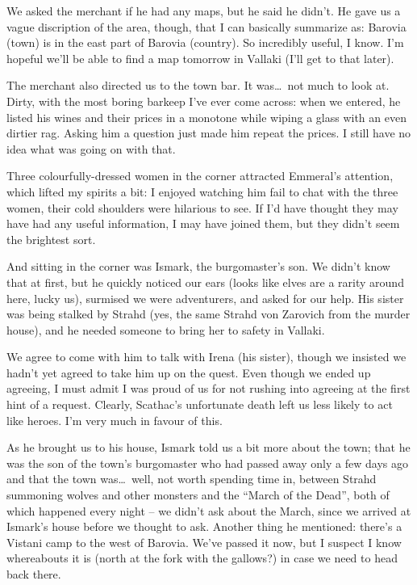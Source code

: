 We asked the merchant if he had any maps, but he said he didn't. He gave us a vague discription of the area, though, that I can basically summarize as: Barovia (town) is in the east part of Barovia (country). So incredibly useful, I know. I'm hopeful we'll be able to find a map tomorrow in Vallaki (I'll get to that later).

The merchant also directed us to the town bar. It was\dots\ not much to look at. Dirty, with the most boring barkeep I've ever come across: when we entered, he listed his wines and their prices in a monotone while wiping a glass with an even dirtier rag. Asking him a question just made him repeat the prices. I still have no idea what was going on with that.

Three colourfully-dressed women in the corner attracted Emmeral's attention, which lifted my spirits a bit: I enjoyed watching him fail to chat with the three women, their cold shoulders were hilarious to see. If I'd have thought they may have had any useful information, I may have joined them, but they didn't seem the brightest sort.

And sitting in the corner was Ismark, the burgomaster's son. We didn't know that at first, but he quickly noticed our ears (looks like elves are a rarity around here, lucky us), surmised we were adventurers, and asked for our help. His sister was being stalked by Strahd (yes, the same Strahd von Zarovich from the murder house), and he needed someone to bring her to safety in Vallaki.

We agree to come with him to talk with Irena (his sister), though we insisted we hadn't yet agreed to take him up on the quest. Even though we ended up agreeing, I must admit I was proud of us for not rushing into agreeing at the first hint of a request. Clearly, Scathac's unfortunate death left us less likely to act like heroes. I'm very much in favour of this.

As he brought us to his house, Ismark told us a bit more about the town; that he was the son of the town's burgomaster who had passed away only a few days ago and that the town was\dots\ well, not worth spending time in, between Strahd summoning wolves and other monsters and the ``March of the Dead'', both of which happened every night -- we didn't ask about the March, since we arrived at Ismark's house before we thought to ask. Another thing he mentioned: there's a Vistani camp to the west of Barovia. We've passed it now, but I suspect I know whereabouts it is (north at the fork with the gallows?) in case we need to head back there.

